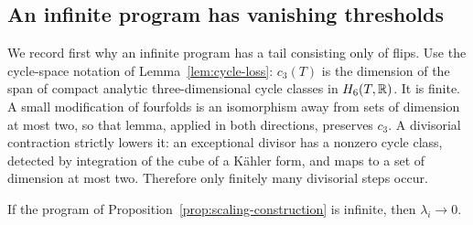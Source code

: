 \subsection{An infinite program has vanishing thresholds}

We record first why an infinite program has a tail consisting only of
flips.  Use the cycle-space notation of Lemma~\ref{lem:cycle-loss}:
\(c_3(T)\) is the dimension of the span of compact analytic
three-dimensional cycle classes in \(H_6(T,\mathbb R)\).  It is finite.
A small modification of fourfolds is an isomorphism away from sets of
dimension at most two, so that lemma, applied in both directions,
preserves \(c_3\).  A divisorial contraction strictly lowers it: an
exceptional divisor has a nonzero cycle class, detected by integration
of the cube of a Kähler form, and maps to a set of dimension at most
two.  Therefore only finitely many divisorial steps occur.

\begin{lemma}\label{lem:scaling-zero}
If the program of Proposition~\ref{prop:scaling-construction} is
infinite, then \(\lambda_i\to0\).
\end{lemma}

